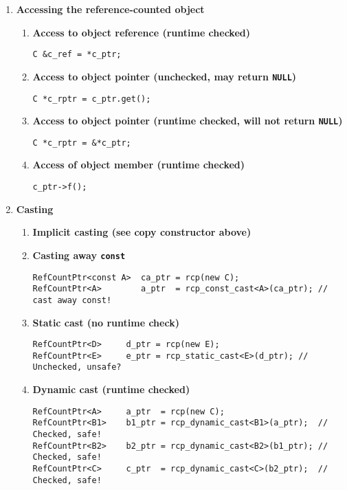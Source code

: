 \begin{enumerate}
\item {\bf Accessing the reference-counted object}
%
\begin{enumerate}
%
\item {\bf Access to object reference (runtime checked)}
%
{\small\begin{verbatim}
C &c_ref = *c_ptr;
\end{verbatim}}
%
\item {\bf Access to object pointer (unchecked, may return \texttt{NULL})}
%
{\small\begin{verbatim}
C *c_rptr = c_ptr.get();
\end{verbatim}}
%
\item {\bf Access to object pointer (runtime checked, will not return \texttt{NULL})}
%
{\small\begin{verbatim}
C *c_rptr = &*c_ptr;
\end{verbatim}}
%
\item {\bf Access of object member (runtime checked)}
%
{\small\begin{verbatim}
c_ptr->f();
\end{verbatim}}
%
\end{enumerate}

\item {\bf Casting}
%
\begin{enumerate}
%
\item {\bf Implicit casting (see copy constructor above)}
%
\item {\bf Casting away \texttt{const}}
%
{\small\begin{verbatim}
RefCountPtr<const A>  ca_ptr = rcp(new C);
RefCountPtr<A>        a_ptr  = rcp_const_cast<A>(ca_ptr); // cast away const!
\end{verbatim}}
%
\item {\bf Static cast (no runtime check)}
%
{\small\begin{verbatim}
RefCountPtr<D>     d_ptr = rcp(new E);
RefCountPtr<E>     e_ptr = rcp_static_cast<E>(d_ptr); // Unchecked, unsafe?
\end{verbatim}}
%
\item {\bf Dynamic cast (runtime checked)}
%
{\small\begin{verbatim}
RefCountPtr<A>     a_ptr  = rcp(new C);
RefCountPtr<B1>    b1_ptr = rcp_dynamic_cast<B1>(a_ptr);  // Checked, safe!
RefCountPtr<B2>    b2_ptr = rcp_dynamic_cast<B2>(b1_ptr); // Checked, safe!
RefCountPtr<C>     c_ptr  = rcp_dynamic_cast<C>(b2_ptr);  // Checked, safe!
\end{verbatim}}
%
\end{enumerate}


\end{enumerate}
